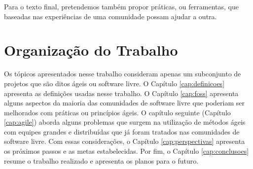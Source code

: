 Para o texto final, pretendemos também propor práticas, ou
ferramentas, que baseadas nas experiências de uma comunidade possam
ajudar a outra.

\section{Organização do Trabalho}
\label{sec:organizacao_trabalho}

Os tópicos apresentados nesse trabalho consideram apenas um
subconjunto de projetos que são ditos ágeis ou software livre. O
Capítulo \ref{cap:definicoes} apresenta as definições usadas nesse
trabalho. O Capítulo \ref{cap:foss} apresenta alguns aspectos da
maioria das comunidades de software livre que poderiam ser melhorados
com práticas ou princípios ágeis. O capítulo seguinte (Capítulo
\ref{cap:agile}) aborda alguns problemas que surgem na utilização de
métodos ágeis com equipes grandes e distribuídas que já foram tratados
nas comunidades de software livre. Com essas considerações, o Capítulo
\ref{cap:perspectivas} apresenta os próximos passos e as metas
estabelecidas. Por fim, o Capítulo \ref{cap:conclusoes} resume o
trabalho realizado e apresenta os planos para o futuro.
